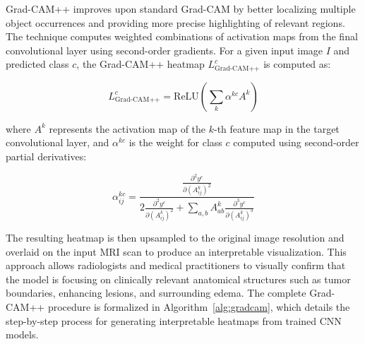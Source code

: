 \documentclass[a4paper,fleqn]{cas-sc}
\begin{document}
Grad-CAM++ improves upon standard Grad-CAM by better localizing multiple object occurrences and providing more precise highlighting of relevant regions. The technique computes weighted combinations of activation maps from the final convolutional layer using second-order gradients. For a given input image $I$ and predicted class $c$, the Grad-CAM++ heatmap $L^c_{\text{Grad-CAM++}}$ is computed as:

\begin{equation}
L^c_{\text{Grad-CAM++}} = \text{ReLU}\left(\sum_{k} \alpha^{kc} A^k\right)
\end{equation}

where $A^k$ represents the activation map of the $k$-th feature map in the target convolutional layer, and $\alpha^{kc}$ is the weight for class $c$ computed using second-order partial derivatives:

\begin{equation}
\alpha^{kc}_{ij} = \frac{\frac{\partial^2 y^c}{\partial (A^k_{ij})^2}}{2\frac{\partial^2 y^c}{\partial (A^k_{ij})^2} + \sum_{a,b} A^k_{ab} \frac{\partial^3 y^c}{\partial (A^k_{ij})^3}}
\end{equation}

The resulting heatmap is then upsampled to the original image resolution and overlaid on the input MRI scan to produce an interpretable visualization. This approach allows radiologists and medical practitioners to visually confirm that the model is focusing on clinically relevant anatomical structures such as tumor boundaries, enhancing lesions, and surrounding edema. The complete Grad-CAM++ procedure is formalized in Algorithm~\ref{alg:gradcam}, which details the step-by-step process for generating interpretable heatmaps from trained CNN models.
\end{document}

